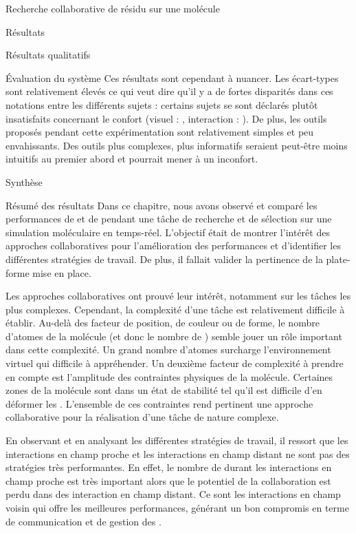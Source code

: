 \documentclass[myfrancais]{mythesis}
\begin{document}
\begin{mychapter}{Recherche collaborative de résidu sur une molécule}
\begin{mysection}{Résultats}
\begin{mysubsection}{Résultats qualitatifs}
\begin{mysubsubsection}{Évaluation du système}
					Ces résultats sont cependant à nuancer.
					Les écart-types sont relativement élevés ce qui veut dire qu'il y a de fortes disparités dans ces notations entre les différents sujets : certains sujets se sont déclarés plutôt insatisfaits concernant le confort (visuel : \mynum{2}, interaction : ).
					De plus, les outils proposés pendant cette expérimentation sont relativement simples et peu envahissants.
					Des outils plus complexes, plus informatifs seraient peut-être moins intuitifs au premier abord et pourrait mener à un inconfort.
				\end{mysubsubsection}
			\end{mysubsection}
		\end{mysection}
		\begin{mysection}{Synthèse}
			\begin{mysubsection}{Résumé des résultats}
				Dans ce chapitre, nous avons observé et comparé les performances de  et de  pendant une tâche de recherche et de sélection sur une simulation moléculaire en temps-réel.
				L'objectif était de montrer l'intérêt des approches collaboratives pour l'amélioration des performances et d'identifier les différentes stratégies de travail.
				De plus, il fallait valider la pertinence de la plate-forme mise en place.

				Les approches collaboratives ont prouvé leur intérêt, notamment sur les tâches les plus complexes.
				Cependant, la complexité d'une tâche est relativement difficile à établir.
				Au-delà des facteur de position, de couleur ou de forme, le nombre d'atomes de la molécule (et donc le nombre de ) semble jouer un rôle important dans cette complexité.
				Un grand nombre d'atomes surcharge l'environnement virtuel qui difficile à appréhender.
				Un deuxième facteur de complexité à prendre en compte est l'amplitude des contraintes physiques de la molécule.
				Certaines zones de la molécule sont dans un état de stabilité tel qu'il est difficile d'en déformer les .
				L'ensemble de ces contraintes rend pertinent une approche collaborative pour la réalisation d'une tâche de nature complexe.

				En observant et en analysant les différentes stratégies de travail, il ressort que les interactions en champ proche et les interactions en champ distant ne sont pas des stratégies très performantes.
				En effet, le nombre de  durant les interactions en champ proche est très important alors que le potentiel de la collaboration est perdu dans des interaction en champ distant.
				Ce sont les interactions en champ voisin qui offre les meilleures performances, générant un bon compromis en terme de communication et de gestion des .


\end{mysubsection}
\end{mysection}
\end{mychapter}
\end{document}
